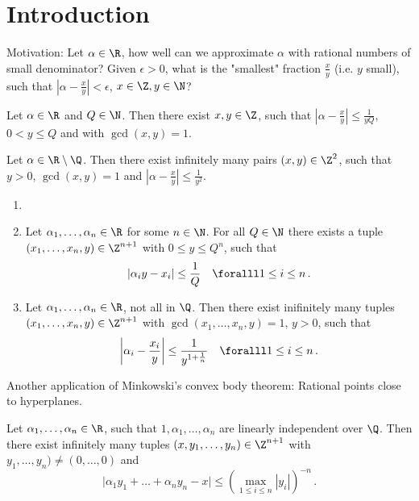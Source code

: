 \section{Introduction}

Motivation: Let \( \alpha \in \R \), how well can we approximate \( \alpha \) with rational numbers of small denominator?
Given \( \epsilon>0 \), what is the "smallest" fraction \( \frac{x}{y} \) (i.e. \( y \) small), such that \( \left| \alpha - \frac{x}{y} \right| < \epsilon \), \( x \in \Z, y \in \N \)?

\begin{thmn}[Dirichlet, 1842]
	Let \( \alpha \in \R \) and \( Q \in \N \).
	Then there exist \( x,y \in \Z \), such that \( \left| \alpha - \frac{x}{y} \right| \leq \frac{1}{yQ} \), \( 0 < y \leq Q \) and with \( \gcd(x,y) = 1 \).
\end{thmn}

\begin{cor}\label{thm:4.2}
	Let \( \alpha \in \R \setminus \Q \).
	Then there exist infinitely many pairs \( (x,y) \in \Z^2 \), such that \( y > 0 \), \( \gcd(x,y)=1 \) and \( \left| \alpha - \frac{x}{y} \right| \leq \frac{1}{y^2} \).
\end{cor}

\begin{thmn}[Dirichlet, 1842] \label{thm:dirichlet_solutions}
	\begin{enumerate}[label=(\alph*)]
		\item[]
		\item Let \( \alpha_1, \dotsc, \alpha_n \in \R \) for some \( n \in \N \).
			For all \( Q \in \N \) there exists a tuple \( (x_1, \dotsc, x_n, y) \in \Z^{n+1} \) with \( 0 \leq y \leq Q^n \), such that
			\[ \left| \alpha_i y - x_i \right| \leq \frac{1}{Q} \quad \foralll 1 \leq i \leq n \,. \]
		\item Let \( \alpha_1, \dotsc, \alpha_n \in \R \), not all in \( \Q \).
			Then there exist inifinitely many tuples \( (x_1, \dotsc, x_n, y) \in \Z^{n+1} \) with \( \gcd(x_1, \dotsc, x_n, y) = 1 \), \( y>0 \), such that
			\[ \left| \alpha_i - \frac{x_i}{y} \right| \leq \frac{1}{y^{1 + \frac{1}{n}}} \quad \foralll 1 \leq i \leq n \,. \]
	\end{enumerate}
\end{thmn}

Another application of Minkowski's convex body theorem: Rational points close to hyperplanes.

\begin{thmn}
	Let \( \alpha_1, \dotsc, \alpha_n \in \R \), such that \( 1, \alpha_1, \dotsc, \alpha_n \) are linearly independent over \( \Q \).
	Then there exist infinitely many tuples \( (x, y_1, \dotsc, y_n) \in \Z^{n+1} \) with \( y_1, \dotsc, y_n) \neq (0, \dotsc, 0) \) and
	\[ \big| \alpha_1 y_1 + \dots + \alpha_n y_n - x \big| \leq \left( \max_{1 \leq i \leq n} |y_i| \right)^{-n} \,. \]
\end{thmn}

